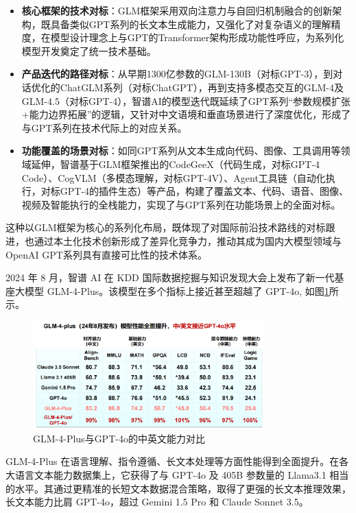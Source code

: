 \begin{itemize}
	\item \textbf{核心框架的技术对标}：GLM框架采用双向注意力与自回归机制融合的创新架构，既具备类似GPT系列的长文本生成能力，又强化了对复杂语义的理解精度，在模型设计理念上与GPT的Transformer架构形成功能性呼应，为系列化模型开发奠定了统一技术基础。
	\item \textbf{产品迭代的路径对标}：从早期1300亿参数的GLM-130B（对标GPT-3），到对话优化的ChatGLM系列（对标ChatGPT），再到支持多模态交互的GLM-4及GLM-4.5（对标GPT-4），智谱AI的模型迭代既延续了GPT系列“参数规模扩张+能力边界拓展”的逻辑，又针对中文语境和垂直场景进行了深度优化，形成了与GPT系列在技术代际上的对应关系。
	\item \textbf{功能覆盖的场景对标}：如同GPT系列从文本生成向代码、图像、工具调用等领域延伸，智谱基于GLM框架推出的CodeGeeX（代码生成，对标GPT-4 Code）、CogVLM（多模态理解，对标GPT-4V）、Agent工具链（自动化执行，对标GPT-4的插件生态）等产品，构建了覆盖文本、代码、语音、图像、视频及智能执行的全栈能力，实现了与GPT系列在功能场景上的全面对标。
\end{itemize}

这种以GLM框架为核心的系列化布局，既体现了对国际前沿技术路线的对标跟进，也通过本土化技术创新形成了差异化竞争力，推动其成为国内大模型领域与OpenAI GPT系列具有直接可比性的技术体系。

2024 年 8 月，智谱 AI 在 KDD 国际数据挖掘与知识发现大会上发布了新一代基座大模型 GLM-4-Plus。该模型在多个指标上接近甚至超越了 GPT-4o, 如图\ref{fig:glm4plus}所示。

\begin{figure}[H]
	\centering
	\includegraphics[width=0.8\textwidth]{figures/chapter1/fig2.png}
	\caption{GLM-4-Plus与GPT-4o的中英文能力对比}
	\label{fig:glm4plus}
\end{figure}

GLM-4-Plus 在语言理解、指令遵循、长文本处理等方面性能得到全面提升。在各大语言文本能力数据集上，它获得了与 GPT-4o 及 405B 参数量的 Llama3.1 相当的水平。其通过更精准的长短文本数据混合策略，取得了更强的长文本推理效果，长文本能力比肩 GPT-4o，超过 Gemini 1.5 Pro 和 Claude Sonnet 3.5。

